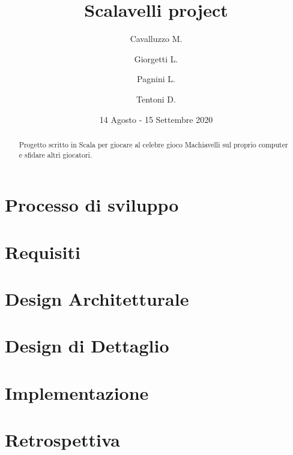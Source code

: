 \documentclass{article}
\title{Scalavelli project}
\date{14 Agosto - 15 Settembre 2020}
\author{
Cavalluzzo M.
\and
Giorgetti L.
\and
Pagnini L.
\and
Tentoni D.
}
\begin{document}
  \maketitle
  \newpage

  \begin{abstract}
    Progetto scritto in Scala per giocare al celebre gioco Machiavelli sul proprio computer e sfidare altri giocatori.
  \end{abstract}

  \tableofcontents

  \newpage


  \section{Processo di sviluppo}\label{sec:processo-di-sviluppo}
  


  \section{Requisiti}\label{sec:requisiti}
  


  \section{Design Architetturale}\label{sec:design-architetturale}
  

  \section{Design di Dettaglio}\label{sec:design-di-dettaglio}
  


  \section{Implementazione}\label{sec:implementazione}
  


  \section{Retrospettiva}\label{sec:retrospettiva}
  
\end{document}
